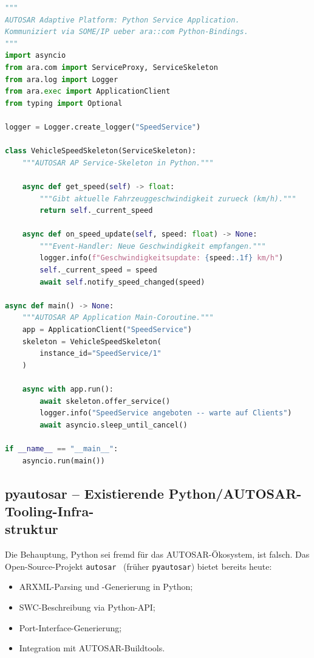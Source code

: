 ﻿\documentclass[12pt,a4paper,twoside]{article}
\begin{document}
\begin{lstlisting}[language=Python,caption={Python Adaptive Application (ara-Bindings)},label=lst:pyara]
"""
AUTOSAR Adaptive Platform: Python Service Application.
Kommuniziert via SOME/IP ueber ara::com Python-Bindings.
"""
import asyncio
from ara.com import ServiceProxy, ServiceSkeleton
from ara.log import Logger
from ara.exec import ApplicationClient
from typing import Optional

logger = Logger.create_logger("SpeedService")

class VehicleSpeedSkeleton(ServiceSkeleton):
    """AUTOSAR AP Service-Skeleton in Python."""
    
    async def get_speed(self) -> float:
        """Gibt aktuelle Fahrzeuggeschwindigkeit zurueck (km/h)."""
        return self._current_speed
    
    async def on_speed_update(self, speed: float) -> None:
        """Event-Handler: Neue Geschwindigkeit empfangen."""
        logger.info(f"Geschwindigkeitsupdate: {speed:.1f} km/h")
        self._current_speed = speed
        await self.notify_speed_changed(speed)

async def main() -> None:
    """AUTOSAR AP Application Main-Coroutine."""
    app = ApplicationClient("SpeedService")
    skeleton = VehicleSpeedSkeleton(
        instance_id="SpeedService/1"
    )
    
    async with app.run():
        await skeleton.offer_service()
        logger.info("SpeedService angeboten -- warte auf Clients")
        await asyncio.sleep_until_cancel()

if __name__ == "__main__":
    asyncio.run(main())
\end{lstlisting}

\subsection{pyautosar -- Existierende Python/AUTOSAR-Tooling-Infra-\\struktur}
\label{subsec:pyautosar}

Die Behauptung, Python sei fremd für das AUTOSAR-Ökosystem, ist falsch.
Das Open-Source-Projekt \texttt{autosar}~\cite{pyautosar_gh} (früher \texttt{pyautosar})
bietet bereits heute:

\begin{itemize}
  \item ARXML-Parsing und -Generierung in Python;
  \item SWC-Beschreibung via Python-API;
  \item Port-Interface-Generierung;
  \item Integration mit AUTOSAR-Buildtools.
\end{itemize}
\end{document}
